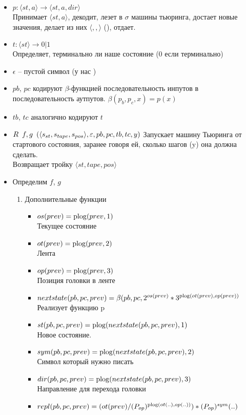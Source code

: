 \begin{itemize}
\item $p: \langle st, a \rangle \to \langle st, a, dir \rangle$\\
Принимает $\langle st, a \rangle$, декодит, лезет в $\sigma$ машины тьюринга, достает новые значения, делает из них $\langle ,,\rangle$ (), отдает.
\item $t: \langle st \rangle \to 0 | 1$\\
Определяет, терминально ли наше состояние ($0$ если терминально)
\item $\epsilon$  -- пустой символ (у нас  )
\item $pb$, $pc$ кодируют $\beta$-функцией последовательность инпутов в последовательность аутпутов. $\beta(p_{b}, p_{c}, x) = p(x)$
\item $tb$, $tc$ аналогично кодируют $t$
\item $R\template{f, g}(\langle s_{st}, s_{tape}, s_{pos} \rangle, \epsilon , pb, pc, tb, tc, y)$
Запускает машину Тьюринга от стартового состояния, заранее говоря ей, сколько шагов (y) она должна сделать.\\
Возвращает тройку $\langle st, tape, pos \rangle$
\item Определим $f$, $g$
\begin{enumerate}
\item Дополнительные функции
\begin{itemize}
\item $os(prev) = \operatorname{plog}(prev, 1)$\\
Текущее состояние
\item $ot(prev) = \operatorname{plog}(prev, 2)$\\
Лента
\item $op(prev) = \operatorname{plog}(prev, 3)$\\
Позиция головки в ленте
\item $nextstate(pb, pc, prev) = \beta(pb, pc, 2^{os(prev)} * 3^{\operatorname{plog}(ot(prev), op(prev))}$\\
Реализует функцию p
\item $st(pb, pc, prev) = \operatorname{plog}(nextstate(pb, pc, prev), 1)$\\
Новое состояние.
\item $sym(pb, pc, prev) = \operatorname{plog}(nextstate(pb, pc, prev), 2)$\\
Символ который нужно писать
\item $dir(pb, pc, prev) = \operatorname{plog}(nextstate(pb, pc, prev), 3)$\\
Направление для перехода головки
\item $repl(pb, pc, prev) = (ot(prev) / (P_{op})^{\operatorname{plog}(ot(..), op(..))}) * (P_{op})^{sym}(..)$

\end{itemize}
\end{enumerate}
\end{itemize}
